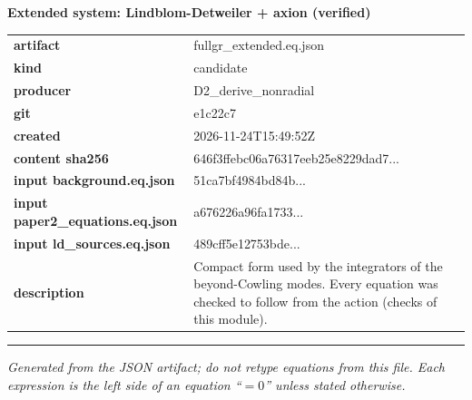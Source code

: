\documentclass[10pt,a4paper]{article}
\begin{document}
{\Large\bfseries Extended system: Lindblom-Detweiler + axion (verified)}\par
\smallskip
\begin{tabular}{@{}lp{}@{}}\textbf{artifact} & fullgr\_extended.eq.json\\\textbf{kind} & candidate\\\textbf{producer} & D2\_derive\_nonradial\\\textbf{git} & e1c22c7\\\textbf{created} & 2026-11-24T15:49:52Z\\\textbf{content sha256} & 646f3ffebc06a76317eeb25e8229dad7...\\\textbf{input background.eq.json} & 51ca7bf4984bd84b...\\\textbf{input paper2\_equations.eq.json} & a676226a96fa1733...\\\textbf{input ld\_sources.eq.json} & 489cff5e12753bde...\\\textbf{description} & Compact form used by the integrators of the beyond-Cowling modes. Every equation was checked to follow from the action (checks of this module).\\\end{tabular}
\par\medskip\hrule\medskip

\textit{Generated from the JSON artifact; do not retype equations from this file. Each expression is the left side of an equation ``$= 0$'' unless stated otherwise.}\par
\end{document}
